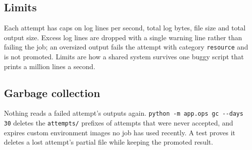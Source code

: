 \subsection{Limits}

Each attempt has caps on log lines per second, total log bytes, file size and
total output size. Excess log lines are dropped with a single warning line
rather than failing the job; an oversized output fails the attempt with
category \texttt{resource} and is not promoted. Limits are how a shared
system survives one buggy script that prints a million lines a second.

\subsection{Garbage collection}

Nothing reads a failed attempt's outputs again.
\verb|python -m app.ops gc --days 30| deletes the \texttt{attempts/} prefixes of attempts that were never
accepted, and expires custom environment images no job has used recently. A
test proves it deletes a lost attempt's partial file while keeping the
promoted result.
